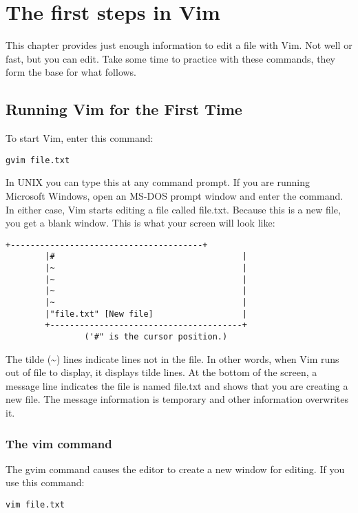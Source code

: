 \section{The first steps in Vim}
This chapter provides just enough information to edit a file with Vim.  Not
well or fast, but you can edit.  Take some time to practice with these
commands, they form the base for what follows.

\subsection{Running Vim for the First Time}
To start Vim, enter this command:

\begin{Verbatim}[samepage=true]
 gvim file.txt
\end{Verbatim}

In UNIX you can type this at any command prompt.
If you are running Microsoft Windows, open an MS-DOS prompt window and enter the command.
In either case, Vim starts editing a file called file.txt.
Because this is a new file, you get a blank window.
This is what your screen will look like:

\begin{Verbatim}[samepage=true]
		+---------------------------------------+
		|#                                      |
		|~                                      |
		|~                                      |
		|~                                      |
		|~                                      |
		|"file.txt" [New file]                  |
		+---------------------------------------+
				('#" is the cursor position.)
\end{Verbatim}

The tilde (\textasciitilde) lines indicate lines not in the file.
In other words, when Vim runs out of file to display, it displays tilde lines.
At the bottom of the screen, a message line indicates the file is named file.txt and shows that you are creating a new file.
The message information is temporary and other information overwrites it.

\subsubsection{The vim command}

The gvim command causes the editor to create a new window for editing.
If you use this command:

 \begin{Verbatim}[samepage=true]
 vim file.txt
 \end{Verbatim}

